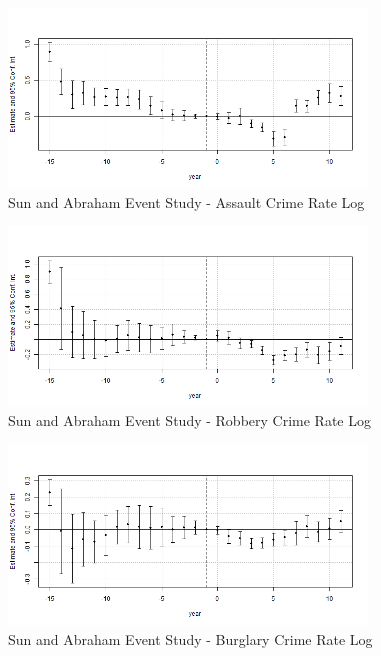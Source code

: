 \documentclass{article}
\begin{document}
\begin{figure}[H]
	\begin{center}
		\includegraphics[width=0.85\textwidth]{assault}
	\end{center}
	\caption{Sun and Abraham Event Study - Assault Crime Rate Log}
	\label{fig:assault_graph}
\end{figure}

\begin{figure}[H]
	\begin{center}
		\includegraphics[width=0.85\textwidth]{robbery}
	\end{center}
	\caption{Sun and Abraham Event Study - Robbery Crime Rate Log}
	\label{fig:robbery_graph}
\end{figure}

\begin{figure}[H]
	\begin{center}
		\includegraphics[width=0.85\textwidth]{burglary}
	\end{center}
	\caption{Sun and Abraham Event Study - Burglary Crime Rate Log}
	\label{fig:burglary_graph}
\end{figure}
\end{document}

